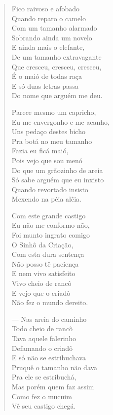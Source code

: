 \begin{verse}
Fico raivoso e afobado\\
Quando reparo o camelo\\
Com um tamanho alarmado\\
Sobrando ainda um novelo\\
E ainda mais o elefante,\\
De um tamanho extravagante\\
Que cresceu, cresceu, cresceu,\\
É o maió de todas raça\\
E só duas letras passa\\
Do nome que arguém me deu.

Parece mesmo um capricho,\\
Eu me envergonho e me acanho,\\
Uns pedaço destes bicho\\
Pra botá no meu tamanho\\
Fazia eu ficá maió,\\
Pois vejo que sou menó\\
Do que um grãozinho de areia\\
Só sabe arguém que eu inxisto\\
Quando revortado insisto\\
Mexendo na péia alêia.

Com este grande castigo\\
Eu não me conformo não,\\
Foi munto ingrato comigo\\
O Sinhô da Criação,\\
Com esta dura sentença\\
Não posso tê paciença\\
E nem vivo satisfeito\\
Vivo cheio de rancô\\
E vejo que o criadô\\
Não fez o mundo dereito.

--- Nas areia do caminho\\
Todo cheio de rancô\\
Tava aquele falerinho\\
Defamando o criadô\\
E só não se estribuchava\\
Pruquê o tamanho não dava\\
Pra ele se estribuchá,\\
Mas porém quem faz assim\\
Como fez o mucuim\\
Vê seu castigo chegá.


\end{verse}
